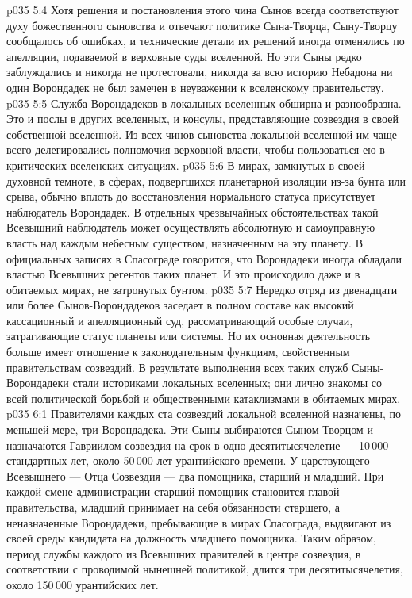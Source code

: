 \vs p035 5:4 Хотя решения и постановления этого чина Сынов всегда соответствуют духу божественного сыновства и отвечают политике Сына\hyp{}Творца, Сыну\hyp{}Творцу сообщалось об ошибках, и технические детали их решений иногда отменялись по апелляции, подаваемой в верховные суды вселенной. Но эти Сыны редко заблуждались и никогда не протестовали, никогда за всю историю Небадона ни один Ворондадек не был замечен в неуважении к вселенскому правительству.
\vs p035 5:5 Служба Ворондадеков в локальных вселенных обширна и разнообразна. Это и послы в других вселенных, и консулы, представляющие созвездия в своей собственной вселенной. Из всех чинов сыновства локальной вселенной им чаще всего делегировались полномочия верховной власти, чтобы пользоваться ею в критических вселенских ситуациях.
\vs p035 5:6 В мирах, замкнутых в своей духовной темноте, в сферах, подвергшихся планетарной изоляции из\hyp{}за бунта или срыва, обычно вплоть до восстановления нормального статуса присутствует наблюдатель Ворондадек. В отдельных чрезвычайных обстоятельствах такой Всевышний наблюдатель может осуществлять абсолютную и самоуправную власть над каждым небесным существом, назначенным на эту планету. В официальных записях в Спасограде говорится, что Ворондадеки иногда обладали властью Всевышних регентов таких планет. И это происходило даже и в обитаемых мирах, не затронутых бунтом.
\vs p035 5:7 Нередко отряд из двенадцати или более Сынов\hyp{}Ворондадеков заседает в полном составе как высокий кассационный и апелляционный суд, рассматривающий особые случаи, затрагивающие статус планеты или системы. Но их основная деятельность больше имеет отношение к законодательным функциям, свойственным правительствам созвездий. В результате выполнения всех таких служб Сыны\hyp{}Ворондадеки стали историками локальных вселенных; они лично знакомы со всей политической борьбой и общественными катаклизмами в обитаемых мирах.
\vs p035 6:1 Правителями каждых ста созвездий локальной вселенной назначены, по меньшей мере, три Ворондадека. Эти Сыны выбираются Сыном Творцом и назначаются Гавриилом  созвездия на срок в одно десятитысячелетие --- 10\,000 стандартных лет, около 50\,000 лет урантийского времени. У царствующего Всевышнего --- Отца Созвездия --- два помощника, старший и младший. При каждой смене администрации старший помощник становится главой правительства, младший принимает на себя обязанности старшего, а неназначенные Ворондадеки, пребывающие в мирах Спасограда, выдвигают из своей среды кандидата на должность младшего помощника. Таким образом, период службы каждого из Всевышних правителей в центре созвездия, в соответствии с проводимой нынешней политикой, длится три десятитысячелетия, около 150\,000 урантийских лет.
